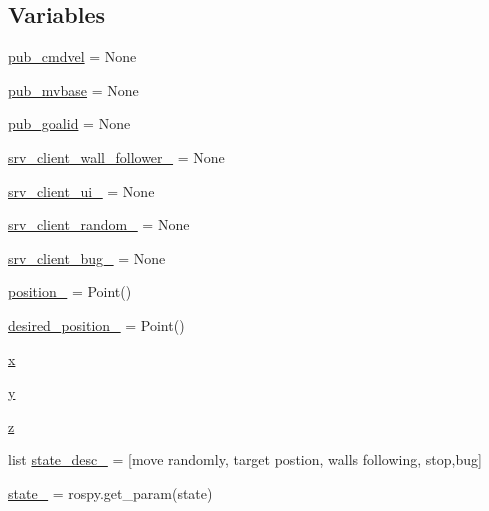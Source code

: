 \subsection*{Variables}
\begin{DoxyCompactItemize}
\item 
\hyperlink{namespacemaster__node_af03f741dfc4d9a61fc42d34ab839fe6e}{pub\+\_\+cmdvel} = None
\item 
\hyperlink{namespacemaster__node_a9a27ed10dbb3608f8a22d7d2d8aa1efa}{pub\+\_\+mvbase} = None
\item 
\hyperlink{namespacemaster__node_ad7127d88e820a8bf947a841356004bf6}{pub\+\_\+goalid} = None
\item 
\hyperlink{namespacemaster__node_afde90e85906bb75fd698d31876e4060a}{srv\+\_\+client\+\_\+wall\+\_\+follower\+\_\+} = None
\item 
\hyperlink{namespacemaster__node_aa24ec2707042d83db651789d2416066f}{srv\+\_\+client\+\_\+ui\+\_\+} = None
\item 
\hyperlink{namespacemaster__node_a042ea25cd5902ccb0c1d8e6b752b32cd}{srv\+\_\+client\+\_\+random\+\_\+} = None
\item 
\hyperlink{namespacemaster__node_ae7e05351b023ff9491aab8db55411203}{srv\+\_\+client\+\_\+bug\+\_\+} = None
\item 
\hyperlink{namespacemaster__node_a2b8dbb239eb4afff7f8a9c3b753453b7}{position\+\_\+} = Point()
\item 
\hyperlink{namespacemaster__node_a3f58d1e6990fe974becd8a318829da8a}{desired\+\_\+position\+\_\+} = Point()
\item 
\hyperlink{namespacemaster__node_a9ea1782ac4a7c8c92e8555fa503ac755}{x}
\item 
\hyperlink{namespacemaster__node_ac413c2def2fcd170aa78888c2e13b0ce}{y}
\item 
\hyperlink{namespacemaster__node_a0aa1d242f836be42c9db48fd53ee63f4}{z}
\item 
list \hyperlink{namespacemaster__node_a8aa254dac660c2d7728f527c2226ed1b}{state\+\_\+desc\+\_\+} = \mbox{[}\textquotesingle{}move randomly\textquotesingle{}, \textquotesingle{}target postion\textquotesingle{}, \textquotesingle{}walls following\textquotesingle{}, \textquotesingle{}stop\textquotesingle{},\textquotesingle{}bug\textquotesingle{}\mbox{]}
\item 
\hyperlink{namespacemaster__node_aceeacc0099424e36d80c5c244ed91886}{state\+\_\+} = rospy.\+get\+\_\+param(\textquotesingle{}state\textquotesingle{})
\end{DoxyCompactItemize}


